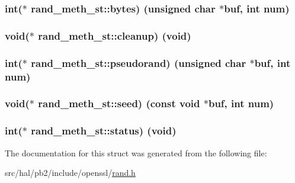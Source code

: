 \subsubsection[{\texorpdfstring{bytes}{bytes}}]{\setlength{\rightskip}{0pt plus 5cm}int($\ast$ rand\+\_\+meth\+\_\+st\+::bytes) (unsigned char $\ast$buf, int num)}\hypertarget{structrand__meth__st_a41a49e87fa960f2e4f46fec63044ad8d}{}\label{structrand__meth__st_a41a49e87fa960f2e4f46fec63044ad8d}
\subsubsection[{\texorpdfstring{cleanup}{cleanup}}]{\setlength{\rightskip}{0pt plus 5cm}void($\ast$ rand\+\_\+meth\+\_\+st\+::cleanup) (void)}\hypertarget{structrand__meth__st_ab043138ccf85baf2d6f12ab1e5011dff}{}\label{structrand__meth__st_ab043138ccf85baf2d6f12ab1e5011dff}
\subsubsection[{\texorpdfstring{pseudorand}{pseudorand}}]{\setlength{\rightskip}{0pt plus 5cm}int($\ast$ rand\+\_\+meth\+\_\+st\+::pseudorand) (unsigned char $\ast$buf, int num)}\hypertarget{structrand__meth__st_a5e7b24146c610773f7eb0470e54b1408}{}\label{structrand__meth__st_a5e7b24146c610773f7eb0470e54b1408}
\subsubsection[{\texorpdfstring{seed}{seed}}]{\setlength{\rightskip}{0pt plus 5cm}void($\ast$ rand\+\_\+meth\+\_\+st\+::seed) (const void $\ast$buf, int num)}\hypertarget{structrand__meth__st_ac5982cb0ac2304a601df7fb009624ec9}{}\label{structrand__meth__st_ac5982cb0ac2304a601df7fb009624ec9}
\subsubsection[{\texorpdfstring{status}{status}}]{\setlength{\rightskip}{0pt plus 5cm}int($\ast$ rand\+\_\+meth\+\_\+st\+::status) (void)}\hypertarget{structrand__meth__st_ab7591ea659457fcd115d7dc0a4e54125}{}\label{structrand__meth__st_ab7591ea659457fcd115d7dc0a4e54125}


The documentation for this struct was generated from the following file\+:\begin{DoxyCompactItemize}
\item 
src/hal/pb2/include/openssl/\hyperlink{rand_8h}{rand.\+h}\end{DoxyCompactItemize}

